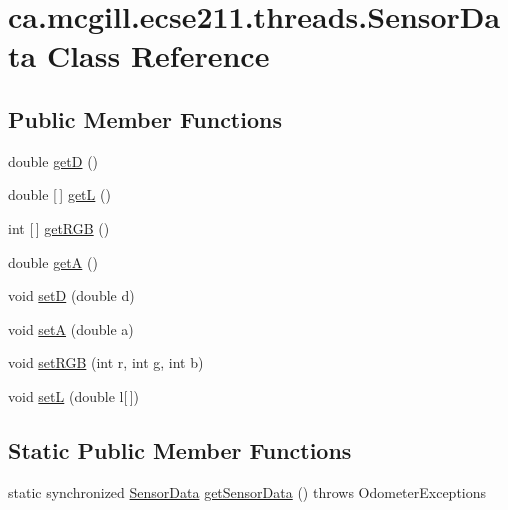 \hypertarget{classca_1_1mcgill_1_1ecse211_1_1threads_1_1_sensor_data}{}\section{ca.\+mcgill.\+ecse211.\+threads.\+Sensor\+Data Class Reference}
\label{classca_1_1mcgill_1_1ecse211_1_1threads_1_1_sensor_data}
\subsection*{Public Member Functions}
\begin{DoxyCompactItemize}
\item 
double \hyperlink{classca_1_1mcgill_1_1ecse211_1_1threads_1_1_sensor_data_a46cc30522719018a80f89624e0ce458f}{getD} ()
\item 
double \mbox{[}$\,$\mbox{]} \hyperlink{classca_1_1mcgill_1_1ecse211_1_1threads_1_1_sensor_data_a39eec50582f0e4bcff8a4669c48e1609}{getL} ()
\item 
int \mbox{[}$\,$\mbox{]} \hyperlink{classca_1_1mcgill_1_1ecse211_1_1threads_1_1_sensor_data_a76313564e284f5cdb66aefce4e595f3b}{get\+R\+GB} ()
\item 
double \hyperlink{classca_1_1mcgill_1_1ecse211_1_1threads_1_1_sensor_data_acc8f6cc56f39c8ea6b812cd8b135eca6}{getA} ()
\item 
void \hyperlink{classca_1_1mcgill_1_1ecse211_1_1threads_1_1_sensor_data_a2c1f8e625478b89aabe6e9911e482ef3}{setD} (double d)
\item 
void \hyperlink{classca_1_1mcgill_1_1ecse211_1_1threads_1_1_sensor_data_a35b1941d44e86b81eb7c625efbd3c8ba}{setA} (double a)
\item 
void \hyperlink{classca_1_1mcgill_1_1ecse211_1_1threads_1_1_sensor_data_a6ad23111ecd378099f0b4ed0b6d398bc}{set\+R\+GB} (int r, int g, int b)
\item 
void \hyperlink{classca_1_1mcgill_1_1ecse211_1_1threads_1_1_sensor_data_af905a6f2825716ae1a39bf7f6be09477}{setL} (double l\mbox{[}$\,$\mbox{]})
\end{DoxyCompactItemize}
\subsection*{Static Public Member Functions}
\begin{DoxyCompactItemize}
\item 
static synchronized \hyperlink{classca_1_1mcgill_1_1ecse211_1_1threads_1_1_sensor_data}{Sensor\+Data} \hyperlink{classca_1_1mcgill_1_1ecse211_1_1threads_1_1_sensor_data_a8260aba53b4474ca1275e4ce26157977}{get\+Sensor\+Data} ()  throws Odometer\+Exceptions 
\end{DoxyCompactItemize}
